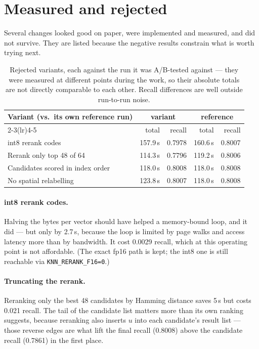 \documentclass[11pt,a4paper]{article}
\newcommand{\code}[1]{\texttt{\small #1}}
\begin{document}
\section{Measured and rejected}

Several changes looked good on paper, were implemented and measured, and did not
survive. They are listed because the negative results constrain what is worth
trying next.

\begin{table}[h]
\centering
\begin{tabular}{lrrrr}
\toprule
Variant (vs.\ its own reference run) & \multicolumn{2}{c}{variant} & \multicolumn{2}{c}{reference} \\
\cmidrule(lr){2-3}\cmidrule(lr){4-5}
 & total & recall & total & recall \\
\midrule
int8 rerank codes                & 157.9\,s & 0.7978 & 160.6\,s & 0.8007 \\
Rerank only top 48 of 64         & 114.3\,s & 0.7796 & 119.2\,s & 0.8006 \\
Candidates scored in index order & 118.0\,s & 0.8008 & 118.0\,s & 0.8008 \\
No spatial relabelling           & 123.8\,s & 0.8007 & 118.0\,s & 0.8008 \\
\bottomrule
\end{tabular}
\caption{Rejected variants, each against the run it was A/B-tested against ---
they were measured at different points during the work, so their absolute totals
are not directly comparable to each other. Recall differences are well outside
run-to-run noise.}
\end{table}

\paragraph{int8 rerank codes.} Halving the bytes per vector should have helped a
memory-bound loop, and it did --- but only by 2.7\,s, because the loop is limited
by page walks and access latency more than by bandwidth. It cost 0.0029 recall,
which at this operating point is not affordable. (The exact fp16 path is kept;
the int8 one is still reachable via \code{KNN\_RERANK\_F16=0}.)

\paragraph{Truncating the rerank.} Reranking only the best 48 candidates by
Hamming distance saves 5\,s but costs 0.021 recall. The tail of the candidate
list matters more than its own ranking suggests, because reranking also inserts
$u$ into each candidate's result list --- those reverse edges are what lift the
final recall (0.8008) above the candidate recall (0.7861) in the first place.
\end{document}
